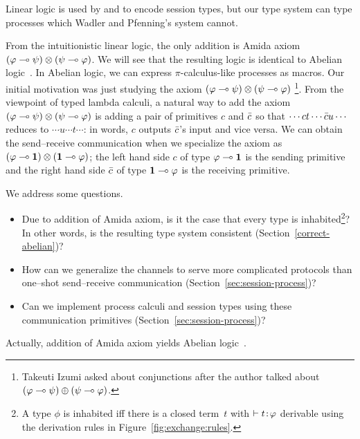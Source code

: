 Linear logic is used by \citet{wadler2012propositions} and
\citet{pfenning2010} to encode session types, but our type system can
type processes
which Wadler
and Pfenning's system cannot.

From the intuitionistic linear logic,
the only addition is Amida axiom
$(\varphi\multimap\psi)\otimes(\psi\multimap\varphi)$.
We will see that the resulting logic is identical to Abelian
logic~\citep{casari1989}.
In Abelian logic, we can express $\pi$-calculus-like processes as macros.
Our initial motivation was just studying the axiom
$(\varphi\multimap\psi)\otimes(\psi\multimap\varphi)$%
\footnote{Takeuti Izumi asked about conjunctions
after the author talked about $(\varphi\multimap\psi)\oplus (\psi\multimap\varphi)$.}.
From the viewpoint of typed lambda calculi, a natural way to add
the axiom
$(\varphi\multimap\psi)\otimes(\psi\multimap\varphi)$
is adding a pair of primitives $c$ and $\bar{c}$ so that
$\cdots ct \cdots \bar{c} u \cdots$ reduces to
$\cdots u  \cdots t \cdots$: in words,
$c$ outputs $\bar{c}$'s input and vice versa.
We can obtain the send--receive communication when we specialize the
axiom as $(\varphi\multimap \mathbf{1})\otimes(\mathbf{1}\multimap\varphi)$; the left hand side
${c}$ of type ${\varphi\multimap\mathbf{1}}$ is the sending primitive and
the right hand side ${\bar{c}}$ of type ${\mathbf{1} \multimap\varphi}$ is the receiving
primitive.


We address some questions.
\begin{itemize}
 \item Due to addition of Amida axiom, is it the case that
       every type is inhabited\footnote{A type $\phi$ is inhabited iff
       there is a closed term~$t$ with $\vdash {t} \mathord{\colon\kern -2pt}{\varphi}$ derivable
       using the derivation rules in Figure~\ref{fig:exchange:rules}.}?
       In other words,
       is the resulting type system consistent (Section~\ref{correct-abelian})?
 \item How can we generalize the channels to serve more complicated
       protocols than one--shot send--receive communication (Section~\ref{sec:session-process})?
 \item Can we implement process calculi and session types using these communication
       primitives (Section~\ref{sec:session-process})?
\end{itemize}
Actually, addition of Amida axiom yields Abelian logic~\citep{casari1989}.

